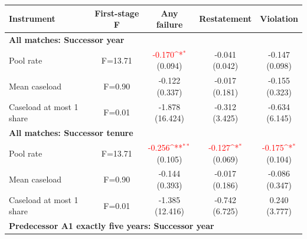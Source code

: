 \documentclass[10pt]{article}
\newcommand{\sym}[1]{\textsuperscript{#1}}
\begin{document}
\begin{minipage}{19cm}\fontsize{10}{12}\selectfont\setlength{\tabcolsep}{4pt}\renewcommand{\arraystretch}{1.12}


\def\sym#1{\ifmmode^{#1}\else\(^{#1}\)\fi}
\centering
{}
\begin{threeparttable}
\begin{tabular}{p{}cccc}
\toprule
Instrument & First-stage F & Any failure & Restatement & Violation \\
\midrule
\multicolumn{5}{l}{\textbf{All matches: Successor year}} \\
Pool rate & F=13.71 & \shortstack{\textcolor{red}{-0.170\sym{*}}\\(0.094)} & \shortstack{-0.041\\(0.042)} & \shortstack{-0.147\\(0.098)} \\
Mean caseload & F=0.90 & \shortstack{-0.122\\(0.337)} & \shortstack{-0.017\\(0.181)} & \shortstack{-0.155\\(0.323)} \\
Caseload at most 1 share & F=0.01 & \shortstack{-1.878\\(16.424)} & \shortstack{-0.312\\(3.425)} & \shortstack{-0.634\\(6.145)} \\
\multicolumn{5}{l}{\textbf{All matches: Successor tenure}} \\
Pool rate & F=13.71 & \shortstack{\textcolor{red}{-0.256\sym{**}}\\(0.105)} & \shortstack{\textcolor{red}{-0.127\sym{*}}\\(0.069)} & \shortstack{\textcolor{red}{-0.175\sym{*}}\\(0.104)} \\
Mean caseload & F=0.90 & \shortstack{-0.144\\(0.393)} & \shortstack{-0.017\\(0.186)} & \shortstack{-0.086\\(0.347)} \\
Caseload at most 1 share & F=0.01 & \shortstack{-1.385\\(12.416)} & \shortstack{-0.742\\(6.725)} & \shortstack{0.240\\(3.777)} \\
\multicolumn{5}{l}{\textbf{Predecessor A1 exactly five years: Successor year}} \\

\end{tabular}
\end{threeparttable}
\end{minipage}
\end{document}
